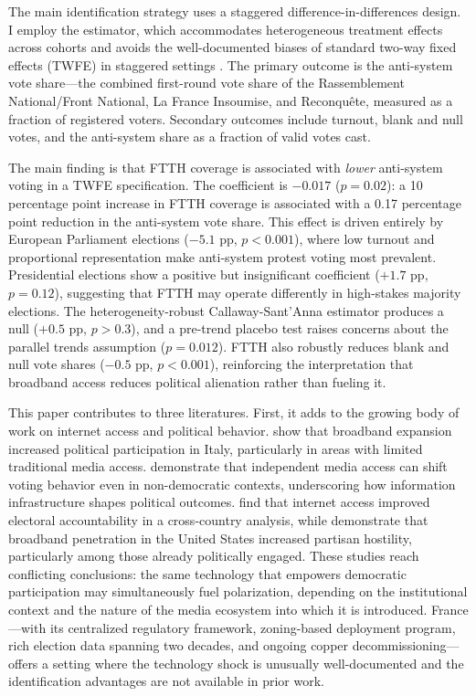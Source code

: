 \documentclass[12pt]{article}
\begin{document}
The main identification strategy uses a staggered difference-in-differences design. I employ the \citet{callaway2021difference} estimator, which accommodates heterogeneous treatment effects across cohorts and avoids the well-documented biases of standard two-way fixed effects (TWFE) in staggered settings \citep{goodman2021difference, sun2021estimating}. The primary outcome is the anti-system vote share---the combined first-round vote share of the Rassemblement National/Front National, La France Insoumise, and Reconqu\^ete, measured as a fraction of registered voters. Secondary outcomes include turnout, blank and null votes, and the anti-system share as a fraction of valid votes cast.

The main finding is that FTTH coverage is associated with \emph{lower} anti-system voting in a TWFE specification. The coefficient is $-0.017$ ($p = 0.02$): a 10 percentage point increase in FTTH coverage is associated with a 0.17 percentage point reduction in the anti-system vote share. This effect is driven entirely by European Parliament elections ($-5.1$ pp, $p < 0.001$), where low turnout and proportional representation make anti-system protest voting most prevalent. Presidential elections show a positive but insignificant coefficient ($+1.7$ pp, $p = 0.12$), suggesting that FTTH may operate differently in high-stakes majority elections. The heterogeneity-robust Callaway-Sant'Anna estimator produces a null ($+0.5$ pp, $p > 0.3$), and a pre-trend placebo test raises concerns about the parallel trends assumption ($p = 0.012$). FTTH also robustly reduces blank and null vote shares ($-0.5$ pp, $p < 0.001$), reinforcing the interpretation that broadband access reduces political alienation rather than fueling it.

This paper contributes to three literatures. First, it adds to the growing body of work on internet access and political behavior. \citet{campante2018long} show that broadband expansion increased political participation in Italy, particularly in areas with limited traditional media access. \citet{enikolopov2011media} demonstrate that independent media access can shift voting behavior even in non-democratic contexts, underscoring how information infrastructure shapes political outcomes. \citet{falck2014does} find that internet access improved electoral accountability in a cross-country analysis, while \citet{lelkes2017hostile} demonstrate that broadband penetration in the United States increased partisan hostility, particularly among those already politically engaged. These studies reach conflicting conclusions: the same technology that empowers democratic participation may simultaneously fuel polarization, depending on the institutional context and the nature of the media ecosystem into which it is introduced. France---with its centralized regulatory framework, zoning-based deployment program, rich election data spanning two decades, and ongoing copper decommissioning---offers a setting where the technology shock is unusually well-documented and the identification advantages are not available in prior work.
\end{document}
